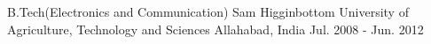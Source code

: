 


\begin{cventries}


\cventry
{B.Tech(Electronics and Communication)} %
{Sam Higginbottom University of Agriculture, Technology and Sciences} %
{Allahabad, India} %
{Jul. 2008 - Jun. 2012} %
{ %
}


\end{cventries}